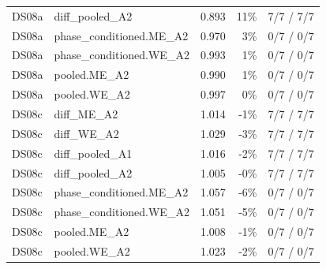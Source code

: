 \documentclass[10pt]{article}
\begin{document}
{\begin{longtable}{llrrr}
DS08a & diff\_pooled\_A2 & 0.893 & 11\% & 7/7 / 7/7 \\
DS08a & phase\_conditioned.ME\_A2 & 0.970 & 3\% & 0/7 / 0/7 \\
DS08a & phase\_conditioned.WE\_A2 & 0.993 & 1\% & 0/7 / 0/7 \\
DS08a & pooled.ME\_A2 & 0.990 & 1\% & 0/7 / 0/7 \\
DS08a & pooled.WE\_A2 & 0.997 & 0\% & 0/7 / 0/7 \\
\midrule
DS08c & diff\_ME\_A2 & 1.014 & -1\% & 7/7 / 7/7 \\
DS08c & diff\_WE\_A2 & 1.029 & -3\% & 7/7 / 7/7 \\
DS08c & diff\_pooled\_A1 & 1.016 & -2\% & 7/7 / 7/7 \\
DS08c & diff\_pooled\_A2 & 1.005 & -0\% & 7/7 / 7/7 \\
DS08c & phase\_conditioned.ME\_A2 & 1.057 & -6\% & 0/7 / 0/7 \\
DS08c & phase\_conditioned.WE\_A2 & 1.051 & -5\% & 0/7 / 0/7 \\
DS08c & pooled.ME\_A2 & 1.008 & -1\% & 0/7 / 0/7 \\
DS08c & pooled.WE\_A2 & 1.023 & -2\% & 0/7 / 0/7 \\
\end{longtable}
\vspace{-0.6em}
}
\end{document}
